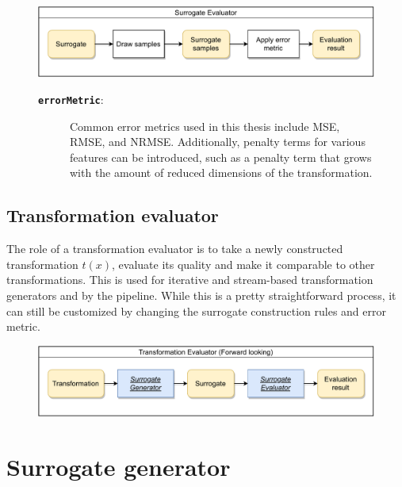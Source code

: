 \documentclass[
  a4paper,  %
  twoside,  %
  bibliography=totoc,
  headsepline,
  cleardoublepage=empty,
  parskip=half,
  draft=false
]{scrbook}
\begin{document}
\begin{figure}[H]
\includegraphics[width=\textwidth]{graphics/SurrogateEval.pdf}
\vspace{-4.5mm}
\begin{mdframed}[linewidth=0.7px]
\begin{description}
\item[\texttt{\textbf{errorMetric}}:] Common error metrics used in this thesis include MSE, RMSE, and NRMSE.
Additionally, penalty terms for various features can be introduced, such as a penalty term that grows with the amount of reduced dimensions of the transformation.
\end{description}
\end{mdframed}
\end{figure}

\subsection {Transformation evaluator}

The role of a transformation evaluator is to take a newly constructed transformation $t(x)$, evaluate its quality and make it comparable to other transformations.
This is used for iterative and stream-based transformation generators and by the pipeline.
While this is a pretty straightforward process, it can still be customized by changing the surrogate construction rules and error metric.

\begin{figure}[H]
\includegraphics[width=\textwidth]{graphics/TransformationEval.pdf}
\vspace{-1.5mm}
\end{figure}

\newpage
\section {Surrogate generator}
\end{document}
